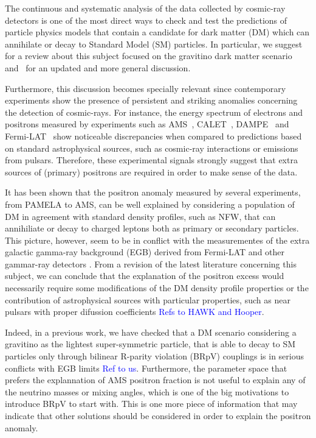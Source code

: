 \documentclass[a4paper,11pt]{article}
\newcommand*{\blue}{\textcolor{blue}}
\begin{document}
The continuous and systematic analysis of the data collected by cosmic-ray detectors is one of the most direct ways to check and test the predictions of particle physics models that contain a candidate for dark matter (DM) which can annihilate or decay to Standard Model (SM) particles. In particular, we suggest~\cite{Grefe:2011dp} for a review about this subject focused on the gravitino dark matter scenario and~\cite{Hooper:2018kfv} for an updated and more general discussion. 

Furthermore, this discussion becomes specially relevant since contemporary experiments show the presence of persistent and striking anomalies concerning the detection of cosmic-rays. For instance, the energy spectrum of electrons and positrons measured by experiments such as AMS~\cite{Accardo:2014lma,Aguilar:2014mma,Aguilar:2014fea}, CALET~\cite{Adriani:2018ktz}, DAMPE~\cite{Ambrosi:2017wek} and Fermi-LAT~\cite{Ackermann:2014usa} show noticeable discrepancies when compared to predictions based on standard astrophysical sources, such as cosmic-ray interactions or emissions from pulsars. Therefore, these experimental signals strongly suggest that extra sources of (primary) positrons are required in order to make sense of the data. 

It has been shown that the positron anomaly measured by several experiments, from PAMELA to AMS, can be well explained by considering a population of DM in agreement with standard density profiles, such as NFW, that can annihiliate or decay to charged leptons
both as primary or secondary particles. This picture, however, seem to be in conflict with the measurementes of the extra galactic gamma-ray background (EGB) derived from Fermi-LAT and other gammar-ray detectors \cite{Grefe:2008zz,2012PhRvD..86h3506C,Ando:2015qda,Laletin:2016egv,Liu:2016ngs,Belotsky:2016tja}. From a revision of the latest literature concerning this subject, we can conclude that the explanation of the positron excess would necessarily require some modifications of the DM density profile properties or the contribution of astrophysical sources with particular properties, such as near pulsars with proper difussion coefficients \blue{Refs to HAWK and Hooper}.

Indeed, in a previous work, we have checked that a DM scenario considering a gravitino as the lightest super-symmetric particle, that is able to decay to SM particles only through bilinear R-parity violation (BRpV) couplings is in serious conflicts with EGB limits \blue{Ref to us}. Furthermore, the parameter space that prefers the explannation of AMS positron fraction is not useful to explain any of the neutrino masses or mixing angles, which is one of the big motivations to introduce BRpV to start with. This is one more piece of information that may indicate that other solutions should be considered in order to explain the positron anomaly. 
\end{document}
